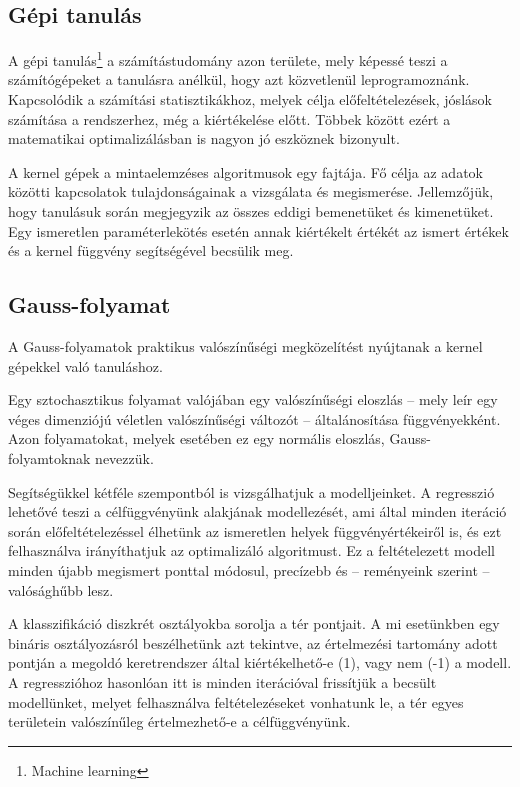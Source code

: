 \subsection{Gépi tanulás}

A gépi tanulás\footnote{Machine learning} a számítástudomány azon területe, mely képessé teszi a számítógépeket a tanulásra anélkül, hogy azt közvetlenül leprogramoznánk. Kapcsolódik a számítási statisztikákhoz, melyek célja előfeltételezések, jóslások számítása a rendszerhez, még a kiértékelése előtt. Többek között ezért a matematikai optimalizálásban is nagyon jó eszköznek bizonyult.

A kernel gépek a mintaelemzéses algoritmusok egy fajtája. Fő célja az adatok közötti kapcsolatok tulajdonságainak a vizsgálata és megismerése. Jellemzőjük, hogy tanulásuk során megjegyzik az összes eddigi bemenetüket és kimenetüket. Egy ismeretlen paraméterlekötés esetén annak kiértékelt értékét az ismert értékek és a kernel függvény segítségével becsülik meg.

\subsection{Gauss-folyamat}

A Gauss-folyamatok praktikus valószínűségi megközelítést nyújtanak a kernel gépekkel való tanuláshoz. 

Egy sztochasztikus folyamat valójában egy valószínűségi eloszlás -- mely leír egy véges dimenziójú véletlen valószínűségi változót -- általánosítása függvényekként. Azon folyamatokat, melyek esetében ez egy normális eloszlás, Gauss-folyamtoknak nevezzük.

Segítségükkel kétféle szempontból is vizsgálhatjuk a modelljeinket. A regresszió lehetővé teszi a célfüggvényünk alakjának modellezését, ami által minden iteráció során előfeltételezéssel élhetünk az ismeretlen helyek függvényértékeiről is, és ezt felhasználva irányíthatjuk az optimalizáló algoritmust. Ez a feltételezett modell minden újabb megismert ponttal módosul, precízebb és -- reményeink szerint -- valósághűbb lesz.

A klasszifikáció diszkrét osztályokba sorolja a tér pontjait. A mi esetünkben egy bináris osztályozásról beszélhetünk azt tekintve, az értelmezési tartomány adott pontján a megoldó keretrendszer által kiértékelhető-e (1), vagy nem (-1) a modell. A regresszióhoz hasonlóan itt is minden iterációval frissítjük a becsült modellünket, melyet felhasználva feltételezéseket vonhatunk le, a tér egyes területein valószínűleg értelmezhető-e a célfüggvényünk.\cite{GPKonyv}

